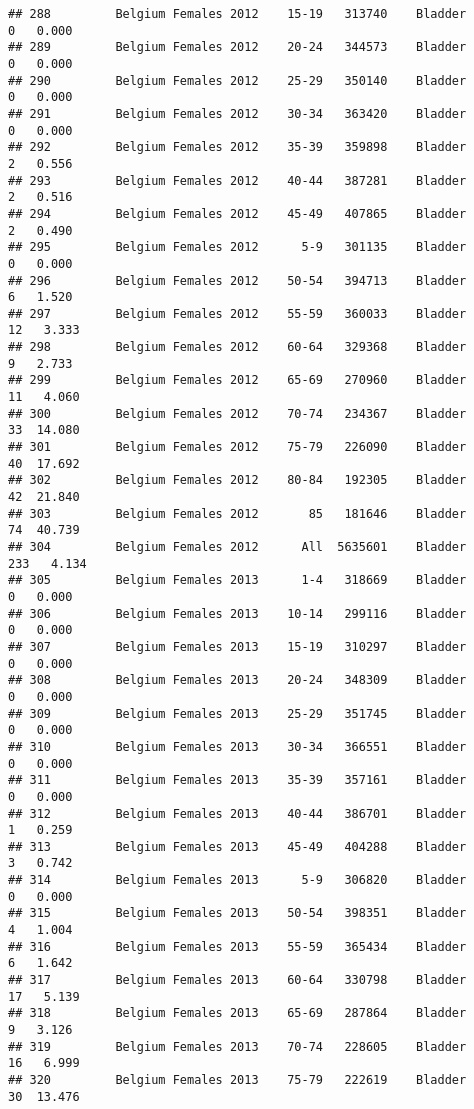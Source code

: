 \documentclass[
]{article}
\begin{document}
\begin{verbatim}
## 288         Belgium Females 2012    15-19   313740    Bladder      0   0.000
## 289         Belgium Females 2012    20-24   344573    Bladder      0   0.000
## 290         Belgium Females 2012    25-29   350140    Bladder      0   0.000
## 291         Belgium Females 2012    30-34   363420    Bladder      0   0.000
## 292         Belgium Females 2012    35-39   359898    Bladder      2   0.556
## 293         Belgium Females 2012    40-44   387281    Bladder      2   0.516
## 294         Belgium Females 2012    45-49   407865    Bladder      2   0.490
## 295         Belgium Females 2012      5-9   301135    Bladder      0   0.000
## 296         Belgium Females 2012    50-54   394713    Bladder      6   1.520
## 297         Belgium Females 2012    55-59   360033    Bladder     12   3.333
## 298         Belgium Females 2012    60-64   329368    Bladder      9   2.733
## 299         Belgium Females 2012    65-69   270960    Bladder     11   4.060
## 300         Belgium Females 2012    70-74   234367    Bladder     33  14.080
## 301         Belgium Females 2012    75-79   226090    Bladder     40  17.692
## 302         Belgium Females 2012    80-84   192305    Bladder     42  21.840
## 303         Belgium Females 2012       85   181646    Bladder     74  40.739
## 304         Belgium Females 2012      All  5635601    Bladder    233   4.134
## 305         Belgium Females 2013      1-4   318669    Bladder      0   0.000
## 306         Belgium Females 2013    10-14   299116    Bladder      0   0.000
## 307         Belgium Females 2013    15-19   310297    Bladder      0   0.000
## 308         Belgium Females 2013    20-24   348309    Bladder      0   0.000
## 309         Belgium Females 2013    25-29   351745    Bladder      0   0.000
## 310         Belgium Females 2013    30-34   366551    Bladder      0   0.000
## 311         Belgium Females 2013    35-39   357161    Bladder      0   0.000
## 312         Belgium Females 2013    40-44   386701    Bladder      1   0.259
## 313         Belgium Females 2013    45-49   404288    Bladder      3   0.742
## 314         Belgium Females 2013      5-9   306820    Bladder      0   0.000
## 315         Belgium Females 2013    50-54   398351    Bladder      4   1.004
## 316         Belgium Females 2013    55-59   365434    Bladder      6   1.642
## 317         Belgium Females 2013    60-64   330798    Bladder     17   5.139
## 318         Belgium Females 2013    65-69   287864    Bladder      9   3.126
## 319         Belgium Females 2013    70-74   228605    Bladder     16   6.999
## 320         Belgium Females 2013    75-79   222619    Bladder     30  13.476

\end{verbatim}
\end{document}
